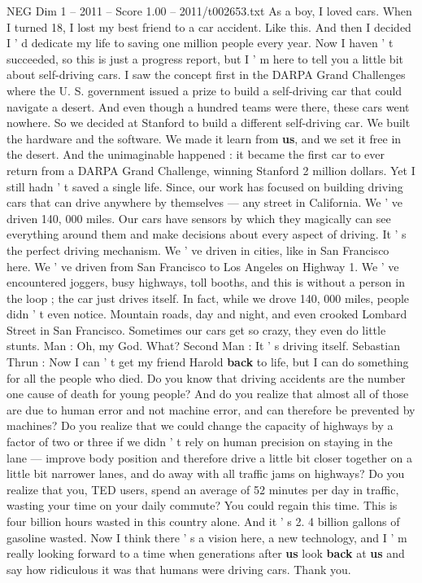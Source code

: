 \begin{textsample}{NEG Dim 1 – 2011 – Score 1.00 – 2011/t002653.txt}  \label{ex:f1_neg_049}
As a boy, I loved cars.
When I turned 18, I lost my best friend to a car accident.
Like this.
And then I decided I ' d dedicate my life to saving one million people every year.
Now I haven ' t succeeded, so this is just a progress report, but I ' m here to tell you a little bit about self-driving cars.
I saw the concept first in the DARPA Grand Challenges where the U.
S. government issued a prize to build a self-driving car that could navigate a desert.
And even though a hundred teams were there, these cars went nowhere.
So we decided at Stanford to build a different self-driving car.
We built the hardware and the software.
We made it learn from \textbf{us}, and we set it free in the desert.
And the unimaginable happened : it became the first car to ever return from a DARPA Grand Challenge, winning Stanford 2 million dollars.
Yet I still hadn ' t saved a single life.
Since, our work has focused on building driving cars that can drive anywhere by themselves — any street in California.
We ' ve driven 140, 000 miles.
Our cars have sensors by which they magically can see everything around them and make decisions about every aspect of driving.
It ' s the perfect driving mechanism.
We ' ve driven in cities, like in San Francisco here.
We ' ve driven from San Francisco to Los Angeles on Highway 1.
We ' ve encountered joggers, busy highways, toll booths, and this is without a person in the loop ; the car just drives itself.
In fact, while we drove 140, 000 miles, people didn ' t even notice.
Mountain roads, day and night, and even crooked Lombard Street in San Francisco.
Sometimes our cars get so crazy, they even do little stunts.
Man : Oh, my God.
What?
Second Man : It ' s driving itself.
Sebastian Thrun : Now I can ' t get my friend Harold \textbf{back} to life, but I can do something for all the people who died.
Do you know that driving accidents are the number one cause of death for young people?
And do you realize that almost all of those are due to human error and not machine error, and can therefore be prevented by machines?
Do you realize that we could change the capacity of highways by a factor of two or three if we didn ' t rely on human precision on staying in the lane — improve body position and therefore drive a little bit closer together on a little bit narrower lanes, and do away with all traffic jams on highways?
Do you realize that you, TED users, spend an average of 52 minutes per day in traffic, wasting your time on your daily commute?
You could regain this time.
This is four billion hours wasted in this country alone.
And it ' s 2. 4 billion gallons of gasoline wasted.
Now I think there ' s a vision here, a new technology, and I ' m really looking forward to a time when generations after \textbf{us} look \textbf{back} at \textbf{us} and say how ridiculous it was that humans were driving cars.
Thank you.

\end{textsample}

